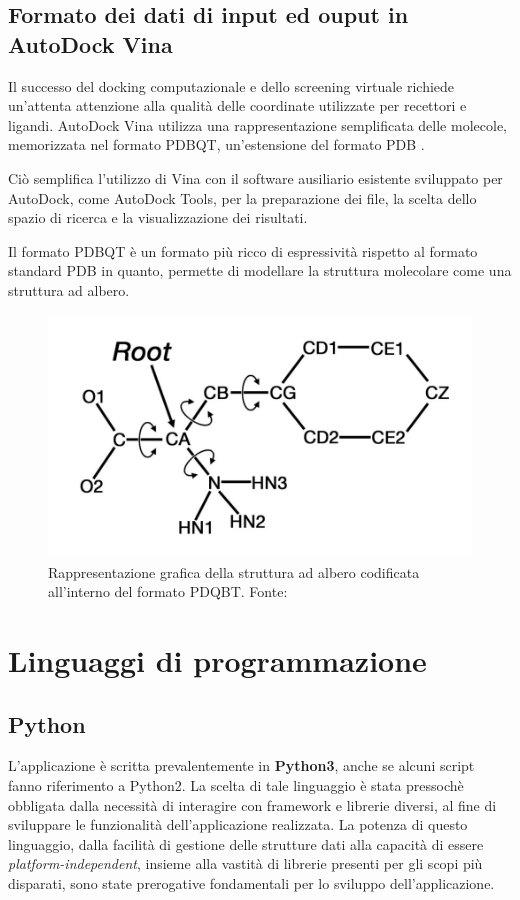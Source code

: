 \subsection{Formato dei dati di input ed ouput in AutoDock Vina}
Il successo del docking computazionale e dello screening virtuale richiede un'attenta attenzione alla qualità delle coordinate utilizzate per recettori e ligandi. AutoDock Vina utilizza una rappresentazione semplificata delle molecole, memorizzata nel formato PDBQT, un'estensione del formato PDB \cite{forli_computational_2016}.

Ciò semplifica l'utilizzo di Vina con il software ausiliario esistente sviluppato per AutoDock, come AutoDock Tools, per la preparazione dei file, la scelta dello spazio di ricerca e la visualizzazione dei risultati. \cite{trott_autodock_2009}

Il formato PDBQT è un formato più ricco di espressività rispetto al formato standard PDB in quanto, permette di modellare la struttura molecolare come una struttura ad albero.

\begin{figure}[H]
    \centering
    \includegraphics[scale=0.5]{images/chapter2/pdbqt.jpg}
    \caption[Rappresentazione grafica del formato PDQBT.]{Rappresentazione grafica della struttura ad albero codificata all'interno del formato PDQBT. Fonte: \cite{eberhardt_autodock_nodate}}
    \label{fig:pdbqt}
\end{figure}

\section{Linguaggi di programmazione}
\subsection{Python}
L'applicazione è scritta prevalentemente in \textbf{Python3}, anche se alcuni script fanno riferimento a Python2. La scelta di tale linguaggio è stata pressochè obbligata dalla necessità di interagire con framework e librerie diversi, al fine di sviluppare le funzionalità dell'applicazione realizzata.
La potenza di questo linguaggio, dalla facilità di gestione delle strutture dati alla capacità di essere \textit{platform-independent}, insieme alla vastità di librerie presenti per gli scopi più disparati, sono state prerogative fondamentali per lo sviluppo dell'applicazione.

